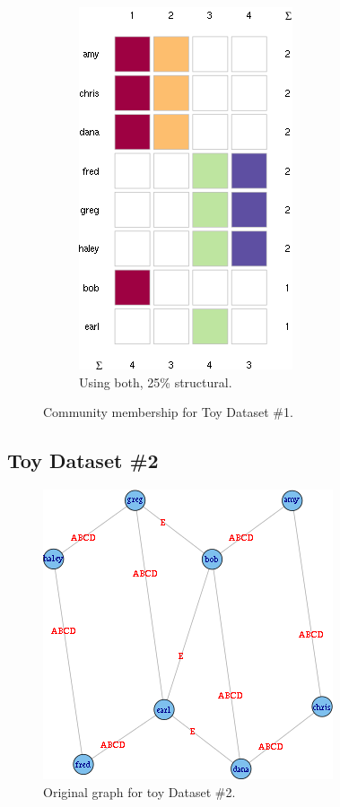 \documentclass{report} %
\begin{document}
\begin{figure}
\begin{subfigure}{.6\textwidth}
  \includegraphics[width=.6\linewidth]{toy2/ea/top20_0.25.png}
  \caption{Using both, 25\% structural.}
  \label{fig:sub4}
\end{subfigure}
\caption{Community membership for Toy Dataset \#1.}
\label{fig:test2}
\end{figure}



\subsection*{Toy Dataset \#2}

\begin{figure}[htp!]
  \centering
  \includegraphics[width=0.5\linewidth]{toy3/orig.png}
  \caption{Original graph for toy Dataset \#2.}
\end{figure}
\end{document}
